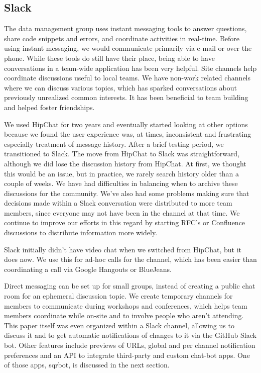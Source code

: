 \subsection{Slack}
\label{sec:slack}

The data management group uses instant messaging tools  to answer questions,
share code snippets and errors, and coordinate activities in real-time.
Before using instant messaging, we would communicate primarily via e-mail or
over the phone. While these tools do still have their place, being able to have
conversations in a team-wide application has been very helpful.
Site channels help coordinate discussions
useful to local teams.  We have non-work related channels where we can
discuss various topics, which has sparked conversations about previously
unrealized common interests. It has been beneficial to team building and
helped foster friendships.


We used HipChat for two years and eventually started looking at other options
because we found the user experience was, at times, inconsistent and
frustrating especially treatment of message history.
After a brief testing period, we transitioned to Slack.
The move from HipChat to Slack was straightforward,
although we did lose the discussion history from HipChat.  At first, we
thought this would be an issue, but in practice, we rarely search history older
than a couple of weeks.  We have had difficulties in balancing when to
archive these discussions for the community.  We've also had some problems
making sure that decisions made within a Slack conversation were
distributed to more team members, since everyone may not have been in the
channel at that time.  We continue to improve our efforts in this regard by
starting RFC's or Confluence discussions to distribute information more widely.

\noindent Slack initially didn't have video chat when we switched from HipChat, but
it does now.  We use this for ad-hoc calls for the channel, which has been
easier than coordinating a call via Google Hangouts or BlueJeans.

Direct messaging can be set up for small groups,
instead of creating a public chat room for an ephemeral discussion topic.
We create temporary channels for members to communicate during workshops and
conferences, which helps team members coordinate while on-site and to involve
people who aren't attending.  This paper itself was even organized
within a Slack channel, allowing us to discuss it and to get automatic
notifications of changes to it via the GitHub Slack bot.
Other features include previews of URLs, global and per channel notification preferences and an
API to integrate third-party and custom chat-bot apps. One of those apps,
sqrbot, is discussed in the next section.


